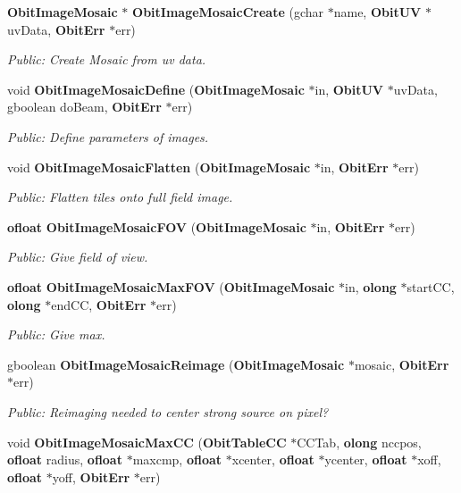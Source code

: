 \begin{CompactItemize}
{\bf Obit\-Image\-Mosaic} $\ast$ {\bf Obit\-Image\-Mosaic\-Create} (gchar $\ast$name, {\bf Obit\-UV} $\ast$uv\-Data, {\bf Obit\-Err} $\ast$err)
\begin{CompactList}\small\item\em Public: Create Mosaic from uv data. \item\end{CompactList}\item 
void {\bf Obit\-Image\-Mosaic\-Define} ({\bf Obit\-Image\-Mosaic} $\ast$in, {\bf Obit\-UV} $\ast$uv\-Data, gboolean do\-Beam, {\bf Obit\-Err} $\ast$err)
\begin{CompactList}\small\item\em Public: Define parameters of images. \item\end{CompactList}\item 
void {\bf Obit\-Image\-Mosaic\-Flatten} ({\bf Obit\-Image\-Mosaic} $\ast$in, {\bf Obit\-Err} $\ast$err)
\begin{CompactList}\small\item\em Public: Flatten tiles onto full field image. \item\end{CompactList}\item 
{\bf ofloat} {\bf Obit\-Image\-Mosaic\-FOV} ({\bf Obit\-Image\-Mosaic} $\ast$in, {\bf Obit\-Err} $\ast$err)
\begin{CompactList}\small\item\em Public: Give field of view. \item\end{CompactList}\item 
{\bf ofloat} {\bf Obit\-Image\-Mosaic\-Max\-FOV} ({\bf Obit\-Image\-Mosaic} $\ast$in, {\bf olong} $\ast$start\-CC, {\bf olong} $\ast$end\-CC, {\bf Obit\-Err} $\ast$err)
\begin{CompactList}\small\item\em Public: Give max. \item\end{CompactList}\item 
gboolean {\bf Obit\-Image\-Mosaic\-Reimage} ({\bf Obit\-Image\-Mosaic} $\ast$mosaic, {\bf Obit\-Err} $\ast$err)
\begin{CompactList}\small\item\em Public: Reimaging needed to center strong source on pixel? \item\end{CompactList}\item 
void {\bf Obit\-Image\-Mosaic\-Max\-CC} ({\bf Obit\-Table\-CC} $\ast$CCTab, {\bf olong} nccpos, {\bf ofloat} radius, {\bf ofloat} $\ast$maxcmp, {\bf ofloat} $\ast$xcenter, {\bf ofloat} $\ast$ycenter, {\bf ofloat} $\ast$xoff, {\bf ofloat} $\ast$yoff, {\bf Obit\-Err} $\ast$err)

\end{CompactItemize}
